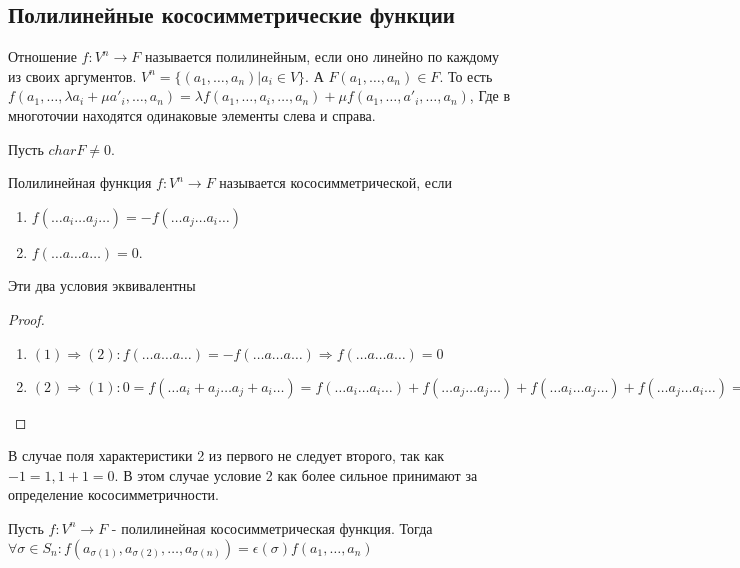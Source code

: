  \subsection{Полилинейные кососимметрические функции}
 \begin{definition}
 	Отношение \(f:V^n\to F\) называется полилинейным, если оно линейно по каждому из своих аргументов. \(V^n = \{(a_1, \ldots, a_n) | a_i\in V\}\). А \(F(a_1, \ldots, a_n)\in F\). То есть \newline\(f(a_1, \ldots, \lambda a_i + \mu a'_i, \ldots, a_n) = \lambda f(a_1, \ldots, a_i, \ldots, a_n) + \mu f(a_1, \ldots, a'_i, \ldots, a_n)\), Где в многоточии находятся одинаковые элементы слева и справа.
 \end{definition}
 Пусть \(char F \ne 0\).
 \begin{definition}
 	Полилинейная функция \(f:V^n\to F\) называется кососимметрической, если 
 	\begin{enumerate}
 		\item \(f(\ldots a_i \ldots a_j \ldots) = - f(\ldots a_j \ldots a_i \ldots)\)
 		\item \(f(\ldots a \ldots a \ldots) = 0\).
 	\end{enumerate}
 \end{definition}
 \begin{proposition}
 	Эти два условия эквивалентны
 \end{proposition}
 \begin{proof}
 	\begin{enumerate}
 		\item \((1)\Longrightarrow (2): f(\ldots a \ldots a \ldots) = -f(\ldots a \ldots a\ldots) \Longrightarrow f(\ldots a \ldots a \ldots) = 0\)
 		\item \((2)\Longrightarrow (1): 0 = f(\ldots a_i+a_j \ldots a_j+a_i \ldots) = f(\ldots a_i \ldots a_i \ldots)+f(\ldots a_j \ldots a_j \ldots) + f(\ldots a_i \ldots a_j \ldots) + f(\ldots a_j \ldots a_i \ldots) = f(\ldots a_i \ldots a_j \ldots) + f(\ldots a_j \ldots a_i \ldots) \Longrightarrow f(\ldots a_i \ldots a_j \ldots) = -f(\ldots a_j \ldots a_i \ldots)\) 
 	\end{enumerate}
 \end{proof}
 \begin{note}
 	В случае поля характеристики 2 из первого не следует второго, так как \(-1 = 1, 1 + 1 = 0\). В этом случае условие 2 как более сильное принимают за определение кососимметричности.
 \end{note}
 \begin{proposition}
 	Пусть \(f:V^n\to F\) - полилинейная кососимметрическая функция. Тогда \(\forall \sigma\in S_n : f(a_{\sigma(1)}, a_{\sigma(2)}, \ldots,a_{\sigma(n)}) = \epsilon(\sigma)f(a_1,\ldots, a_n)\)
 \end{proposition}
